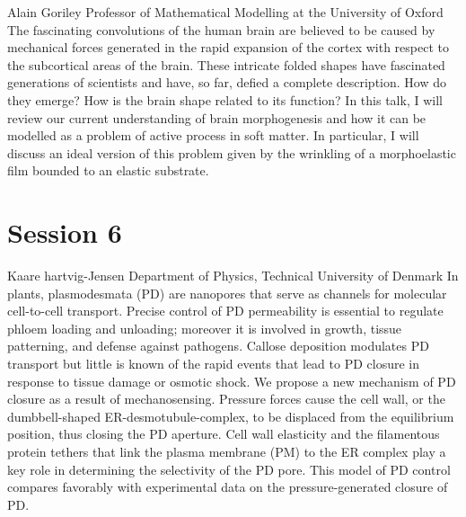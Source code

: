 \documentclass{article}
\begin{document}
{Alain Goriley}
{Professor of Mathematical Modelling at the University of Oxford}
{The fascinating convolutions of the human brain are believed to be caused by
mechanical forces generated in the rapid expansion of the cortex with respect to the
subcortical areas of the brain. These intricate folded shapes have fascinated generations
of scientists and have, so far, defied a complete description. How do they emerge? How is
the brain shape related to its function? In this talk, I will review our current
understanding of brain morphogenesis and how it can be modelled as a problem of active
process in soft matter. In particular, I will discuss an ideal version of this problem
given by the wrinkling of a morphoelastic film bounded to an elastic substrate.}

\newpage
\section*{Session 6}

{Kaare hartvig-Jensen}
{Department of Physics, Technical University of Denmark}
{In plants, plasmodesmata (PD) are nanopores that serve as channels for molecular
cell-to-cell transport. Precise control of PD permeability is essential to regulate phloem
loading and unloading; moreover it is involved in growth, tissue patterning, and defense
against pathogens. Callose deposition modulates PD transport but little is known of the
rapid events that lead to PD closure in response to tissue damage or osmotic shock. We
propose a new mechanism of PD closure as a result of mechanosensing. Pressure forces cause
the cell wall, or the dumbbell-shaped ER-desmotubule-complex, to be displaced from the
equilibrium position, thus closing the PD aperture. Cell wall elasticity and the
filamentous protein tethers that link the plasma membrane (PM) to the ER complex play a
key role in determining the selectivity of the PD pore. This model of PD control compares
favorably with experimental data on the pressure-generated closure of PD.}
\end{document}

